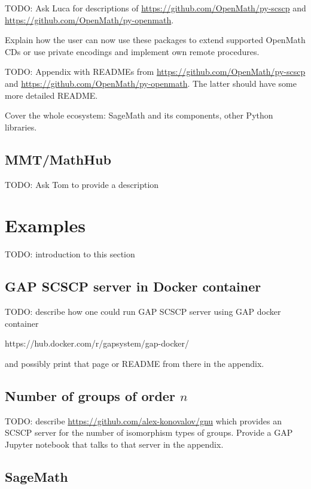 \documentclass{deliverablereport}
\begin{document}
TODO: Ask Luca for descriptions of \url{https://github.com/OpenMath/py-scscp}
and \url{https://github.com/OpenMath/py-openmath}. 

Explain how the user can now use these packages to extend supported OpenMath CDs
or use private encodings and implement own remote procedures.

TODO: Appendix with READMEs from \url{https://github.com/OpenMath/py-scscp}
and \url{https://github.com/OpenMath/py-openmath}. The latter should have
some more detailed README.

Cover the whole ecosystem: SageMath and its components, other Python libraries.


\subsection{MMT/MathHub}

TODO: Ask Tom to provide a description



\section{Examples}\label{examples}

TODO: introduction to this section


\subsection{GAP SCSCP server in Docker container}

TODO: describe how one could run GAP SCSCP server
using GAP docker container 

https://hub.docker.com/r/gapsystem/gap-docker/ 

and possibly print that page or README from there in the appendix.


\subsection{Number of groups of order $n$}\label{gnu-reproducibility}

TODO: describe \url{https://github.com/alex-konovalov/gnu} which provides
an SCSCP server for the number of isomorphism types of groups. Provide
a GAP Jupyter notebook that talks to that server in the appendix.


\subsection{SageMath}
\end{document}
